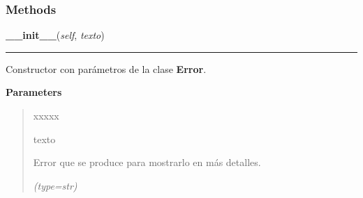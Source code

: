   \subsubsection{Methods}

    \label{error:Error:__init__}

    \vspace{0.5ex}

\hspace{.8\funcindent}\begin{boxedminipage}{\funcwidth}

    \raggedright \textbf{\_\_init\_\_}(\textit{self}, \textit{texto})

    \vspace{-1.5ex}

    \rule{\textwidth}{0.5\fboxrule}
\setlength{\parskip}{2ex}
    Constructor con parámetros de la clase \textbf{Error}.

\setlength{\parskip}{1ex}
      \textbf{Parameters}
      \vspace{-1ex}

      \begin{quote}
        \begin{Ventry}{xxxxx}

          \item[texto]

          Error que se produce para mostrarlo en más detalles.

            {\it (type=str)}

        \end{Ventry}

      \end{quote}

    \end{boxedminipage}

